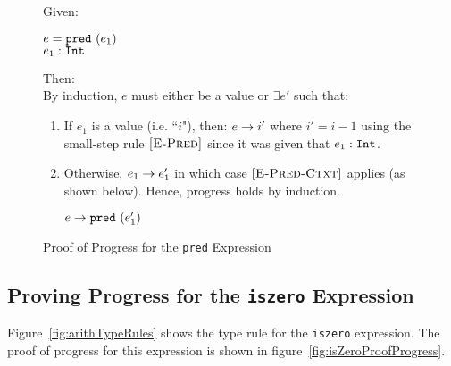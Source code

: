 \documentclass{report}
\newcommand{\rel}[1]{\mbox{\sc [#1]}}
\begin{document}
\begin{figure}[ht!]
Given:
\begin{center}
  $e = \mbox{\tt pred}~(e_1)$ \\
  ${e_1} : {\mbox{\tt Int}}$
\end{center}
Then:~\\

By induction, $e$ must either be a value or $\exists e'$ such that:~\\

	\begin{enumerate}
    \item If $e_1$ is a value (i.e. ``$i$"), then: ${e} \rightarrow {i'}$ where $i' = i - 1$ using the small-step rule $\rel{E-Pred}$ since it was given that ${e_1} : {\mbox{\tt Int}}$.
    
    \item Otherwise, ${e_1} \rightarrow {e'_1}$ in which case $\rel{E-Pred-Ctxt}$ applies (as shown below). Hence, progress holds by induction.
    
    \begin{center}
      ${e} \rightarrow {\mbox{\tt pred}~(e'_1)}$
    \end{center}
	
	\end{enumerate}
	
  \caption{Proof of Progress for the \texttt{pred} Expression}\label{fig:predProofProgress}
\end{figure}

\subsection{Proving Progress for the \texttt{iszero} Expression}

Figure~\ref{fig:arithTypeRules} shows the type rule for the \texttt{iszero} expression.  The proof of progress for this expression is shown in figure~\ref{fig:isZeroProofProgress}.
\end{document}
